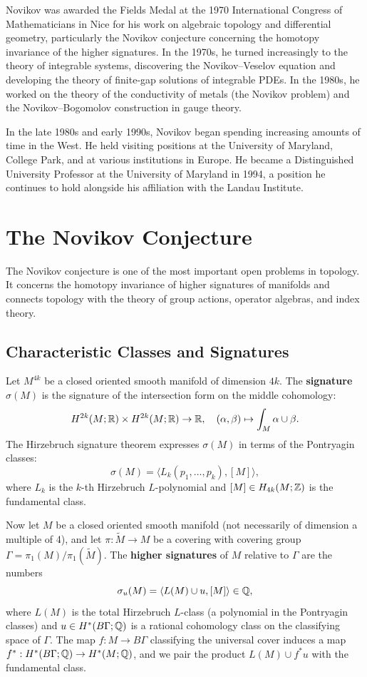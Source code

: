 Novikov was awarded the Fields Medal at the 1970 International Congress of Mathematicians in Nice for his work on algebraic topology and differential geometry, particularly the Novikov conjecture concerning the homotopy invariance of the higher signatures. In the 1970s, he turned increasingly to the theory of integrable systems, discovering the Novikov--Veselov equation and developing the theory of finite-gap solutions of integrable PDEs. In the 1980s, he worked on the theory of the conductivity of metals (the Novikov problem) and the Novikov--Bogomolov construction in gauge theory.

In the late 1980s and early 1990s, Novikov began spending increasing amounts of time in the West. He held visiting positions at the University of Maryland, College Park, and at various institutions in Europe. He became a Distinguished University Professor at the University of Maryland in 1994, a position he continues to hold alongside his affiliation with the Landau Institute.

\section{The Novikov Conjecture}

The Novikov conjecture is one of the most important open problems in topology. It concerns the homotopy invariance of higher signatures of manifolds and connects topology with the theory of group actions, operator algebras, and index theory.

\subsection{Characteristic Classes and Signatures}

Let \(M^{4k}\) be a closed oriented smooth manifold of dimension \(4k\). The \textbf{signature} \(\sigma(M)\) is the signature of the intersection form on the middle cohomology:
\[
H^{2k}(M; \mathbb{R}) \times H^{2k}(M; \mathbb{R}) \to \mathbb{R}, \quad (\alpha, \beta) \mapsto \int_M \alpha \cup \beta.
\]
The Hirzebruch signature theorem expresses \(\sigma(M)\) in terms of the Pontryagin classes:
\[
\sigma(M) = \langle L_k(p_1,\dots,p_k), [M] \rangle,
\]
where \(L_k\) is the \(k\)-th Hirzebruch \(L\)-polynomial and \([M] \in H_{4k}(M; \mathbb{Z})\) is the fundamental class.

Now let \(M\) be a closed oriented smooth manifold (not necessarily of dimension a multiple of 4), and let \(\pi: \widetilde{M} \to M\) be a covering with covering group \(\Gamma = \pi_1(M)/\pi_1(\widetilde{M})\). The \textbf{higher signatures} of \(M\) relative to \(\Gamma\) are the numbers
\[
\sigma_u(M) = \langle L(M) \cup u, [M] \rangle \in \mathbb{Q},
\]
where \(L(M)\) is the total Hirzebruch \(L\)-class (a polynomial in the Pontryagin classes) and \(u \in H^*(B\Gamma; \mathbb{Q})\) is a rational cohomology class on the classifying space of \(\Gamma\). The map \(f: M \to B\Gamma\) classifying the universal cover induces a map \(f^*: H^*(B\Gamma; \mathbb{Q}) \to H^*(M; \mathbb{Q})\), and we pair the product \(L(M) \cup f^* u\) with the fundamental class.


